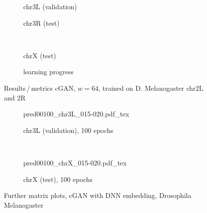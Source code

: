 \begin{figure}[p] %
    \begin{subfigure}{0.45\textwidth}
        \scriptsize
        \caption{chr3L (validation)}
    \end{subfigure} \hfill
    \begin{subfigure}{0.45\textwidth}
        \scriptsize
        \caption{chr3R (test)}
    \end{subfigure}\\[5mm]
    \begin{subfigure}{0.45\textwidth}
        \scriptsize
        \caption{chrX (test)}
    \end{subfigure}\hfill
    \begin{subfigure}{0.45\textwidth}
        \scriptsize
        \caption{learning progress} \label{fig:appendix:GAN64_drosophila_progress}
    \end{subfigure}
    \caption{Results\,/\,metrics cGAN, $w=64$, trained on D. Melanogaster chr2L and 2R}   \label{fig:appendix:GAN64_drosophila_pearson}
\end{figure}
\begin{figure}[htbp]
\begin{subfigure}{\textwidth}
 \centering
 \scriptsize
 {pred00100_chr3L_015-020.pdf_tex}
 \caption{chr3L (validation), 100 epochs}
\end{subfigure}\\[5mm]
\begin{subfigure}{\textwidth}
 \centering
 \scriptsize
 {pred00100_chrX_015-020.pdf_tex}
 \caption{chrX (test), 100 epochs}
\end{subfigure}
\caption{Further matrix plots, cGAN with DNN embedding, Drosophila Melanogaster} \label{fig:appendix:GAN64_drosophila_matrices}
\end{figure}


